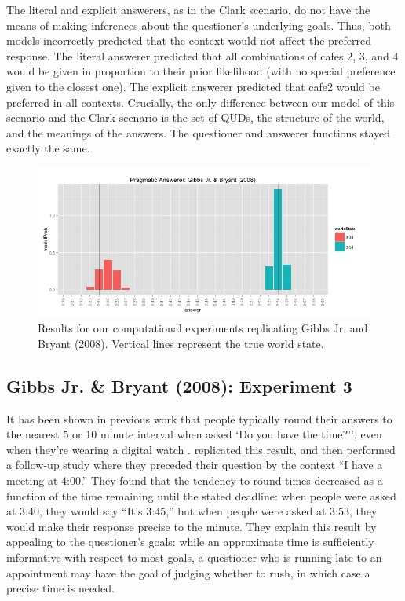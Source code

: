 \documentclass[12pt, floatsintext, jou]{apa6}
\begin{document}
The literal and explicit answerers, as in the Clark scenario, do not have the means of making inferences about the questioner's underlying goals. Thus, both models incorrectly predicted that the context would not affect the preferred response. The literal answerer predicted that all combinations of cafes 2, 3, and 4 would be given in proportion to their prior likelihood (with no special preference given to the closest one). The explicit answerer predicted that cafe2 would be preferred in all contexts.     Crucially, the only difference between our model of this scenario and the Clark scenario is the set of QUDs, the structure of the world, and the meanings of the answers. The questioner and answerer functions stayed exactly the same.

 \begin{figure}[t!]
\begin{center}
\includegraphics[scale = .5]{timeExpResults.jpeg}
\end{center}
\vspace{-.25cm}
\caption{Results for our computational experiments replicating Gibbs Jr. and Bryant (2008). Vertical lines represent the true world state.}
\label{fig:timeExperimentResults}
\end{figure}

\subsection{Gibbs Jr. \& Bryant (2008): Experiment 3}

It has been shown in previous work that people typically round their answers to the nearest 5 or 10 minute interval when asked `Do you have the time?'', even when they're wearing a digital watch \cite{DerHenstCarlesSperber02_RelevanceTellingTime}.   replicated this result, and then performed a follow-up study where they preceded their question by the context ``I have a meeting at 4:00.'' They found that the tendency to round times decreased as a function of the time remaining until the stated deadline: when people were asked at 3:40, they would say ``It's 3:45,'' but when people were asked at 3:53, they would make their response precise to the minute. They explain this result by appealing to the questioner's goals: while an approximate time is sufficiently informative with respect to most goals, a questioner who is running late to an appointment may have the goal of judging whether to rush, in which case a precise time is needed. 
\end{document}
